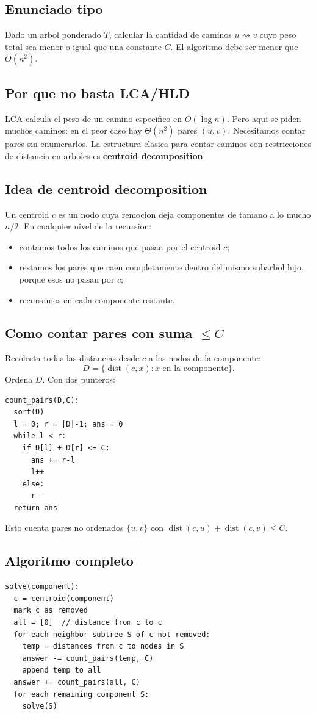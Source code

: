 \documentclass[10pt]{article}
\newcommand{\bigO}{O}
\newcommand{\dist}{\operatorname{dist}}
\begin{document}
\subsection{Enunciado tipo}
Dado un arbol ponderado \(T\), calcular la cantidad de caminos \(u\rightsquigarrow v\) cuyo peso total sea
menor o igual que una constante \(C\). El algoritmo debe ser menor que \(\bigO(n^2)\).

\subsection{Por que no basta LCA/HLD}
LCA calcula el peso de un camino especifico en \(\bigO(\log n)\). Pero aqui se piden muchos caminos: en el peor
caso hay \(\Theta(n^2)\) pares \((u,v)\). Necesitamos contar pares sin enumerarlos. La estructura clasica para
contar caminos con restricciones de distancia en arboles es \textbf{centroid decomposition}.

\subsection{Idea de centroid decomposition}
Un centroid \(c\) es un nodo cuya remocion deja componentes de tamano a lo mucho \(n/2\). En cualquier nivel
de la recursion:
\begin{itemize}
\item contamos todos los caminos que pasan por el centroid \(c\);
\item restamos los pares que caen completamente dentro del mismo subarbol hijo, porque esos no pasan por \(c\);
\item recursamos en cada componente restante.
\end{itemize}

\subsection{Como contar pares con suma \(\le C\)}
Recolecta todas las distancias desde \(c\) a los nodos de la componente:
\[
D=\{\dist(c,x): x \text{ en la componente}\}.
\]
Ordena \(D\). Con dos punteros:
\begin{lstlisting}
count_pairs(D,C):
  sort(D)
  l = 0; r = |D|-1; ans = 0
  while l < r:
    if D[l] + D[r] <= C:
      ans += r-l
      l++
    else:
      r--
  return ans
\end{lstlisting}
Esto cuenta pares no ordenados \(\{u,v\}\) con \(\dist(c,u)+\dist(c,v)\le C\).

\subsection{Algoritmo completo}
\begin{lstlisting}
solve(component):
  c = centroid(component)
  mark c as removed
  all = [0]  // distance from c to c
  for each neighbor subtree S of c not removed:
    temp = distances from c to nodes in S
    answer -= count_pairs(temp, C)
    append temp to all
  answer += count_pairs(all, C)
  for each remaining component S:
    solve(S)
\end{lstlisting}
\end{document}
